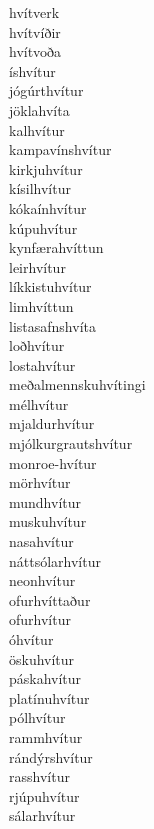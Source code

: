 \documentclass[../samsetningasafn.tex]{subfiles}
\begin{document}
\begin{bigwordlist}
\begin{footnotesize}
\begin{multicols}{4}
\begin{description}
		\item [hvítverk]
		\item [hvítvíðir]
		\item [hvítvoða]
		\item [íshvítur]
		\item [jógúrthvítur]
		\item [jöklahvíta]
		\item [kalhvítur]
		\item [kampavínshvítur]
		\item [kirkjuhvítur]
		\item [kísilhvítur]
		\item [kókaínhvítur]
		\item [kúpuhvítur]
		\item [kynfærahvíttun]
		\item [leirhvítur]
		\item [líkkistuhvítur]
		\item [limhvíttun]
		\item [listasafnshvíta]
		\item [loðhvítur]
		\item [lostahvítur]
		\item [meðalmennskuhvítingi]
		\item [mélhvítur]
		\item [mjaldurhvítur]
		\item [mjólkurgrautshvítur]
		\item [monroe-hvítur]
		\item [mörhvítur]
		\item [mundhvítur]
		\item [muskuhvítur]
		\item [nasahvítur]
		\item [náttsólarhvítur]
		\item [neonhvítur]
		\item [ofurhvíttaður]
		\item [ofurhvítur]
		\item [óhvítur]
		\item [öskuhvítur]
		\item [páskahvítur]
		\item [platínuhvítur]
		\item [pólhvítur]
		\item [rammhvítur]
		\item [rándýrshvítur]
		\item [rasshvítur]
		\item [rjúpuhvítur]
		\item [sálarhvítur]

\end{description}
\end{multicols}
\end{footnotesize}
\end{bigwordlist}
\end{document}
